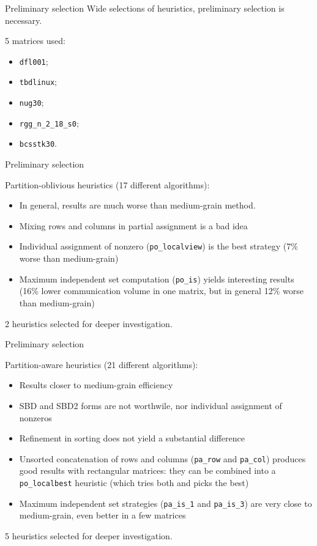 \begin{frame}{Preliminary selection}
	Wide selections of heuristics, preliminary selection is necessary.

	5 matrices used: 

	\begin{itemize}
		\item \texttt{dfl001};
		\item \texttt{tbdlinux};
		\item \texttt{nug30};
		\item \texttt{rgg\_n\_2\_18\_s0};
		\item  \texttt{bcsstk30}. 
	\end{itemize}

\end{frame}

\begin{frame}{Preliminary selection}

	Partition-oblivious heuristics (17 different algorithms):

	\begin{itemize}
		\item In general, results are much worse than medium-grain method.
		\item Mixing rows and columns in partial assignment is a bad idea
		\item Individual assignment of nonzero (\texttt{po\_localview}) is the best strategy (7\% worse than medium-grain)
		\item Maximum independent set computation (\texttt{po\_is}) yields interesting results (16\% lower communication volume in one matrix, but in general 12\% worse than medium-grain)
	\end{itemize}

	2 heuristics selected for deeper investigation.

\end{frame}

\begin{frame}{Preliminary selection}

	Partition-aware heuristics (21 different algorithms):

	\begin{itemize}
		\item Results closer to medium-grain efficiency
		\item SBD and SBD2 forms are not worthwile, nor individual assignment of nonzeros
		\item Refinement in sorting does not yield a substantial difference
		\item Unsorted concatenation of rows and columns (\texttt{pa\_row} and \texttt{pa\_col}) produces good results with rectangular matrices: they can be combined into a \texttt{po\_localbest} heuristic (which tries both and picks the best)
		\item Maximum independent set strategies (\texttt{pa\_is\_1} and \texttt{pa\_is\_3}) are very close to medium-grain, even better in a few matrices
	\end{itemize}

	5 heuristics selected for deeper investigation.

\end{frame}

